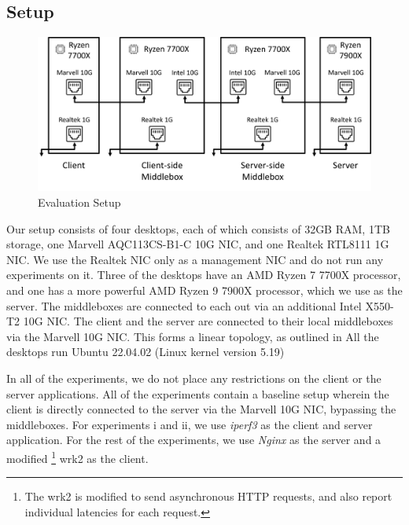 \subsection{Setup}
\label{subsec:netshaper-evaluation-setup}

\begin{figure}[!htb]
    \centering
    \includegraphics[width=\columnwidth]{figures/netshaper/testbed-setup.png}
    \caption{Evaluation Setup}
    \label{fig:testbed-setup}
\end{figure}

Our setup consists of four desktops, each of which consists of 32GB RAM, 1TB storage, one Marvell AQC113CS-B1-C 10G NIC, and one Realtek RTL8111 1G NIC.
We use the Realtek NIC only as a management NIC and do not run any experiments on it.
Three of the desktops have an AMD Ryzen 7 7700X processor, and one has a more powerful AMD Ryzen 9 7900X processor, which we use as the server.
The middleboxes are connected to each out via an additional Intel X550-T2 10G NIC.
The client and the server are connected to their local middleboxes via the Marvell 10G NIC.
This forms a linear topology, as outlined in 
All the desktops run Ubuntu 22.04.02 (Linux kernel version 5.19)

In all of the experiments, we do not place any restrictions on the client or the server applications.
All of the experiments contain a baseline setup wherein the client is directly connected to the server via the Marvell 10G NIC, bypassing the middleboxes.
For experiments i and ii, we use \textit{iperf3} \cite{iPerf3} as the client and server application.
For the rest of the experiments, we use \textit{Nginx} \cite{nginx} as the server and a modified 
\footnote{The wrk2 is modified to send asynchronous HTTP requests, and also report individual latencies for each request.}
wrk2 \cite{wrk2} as the client.